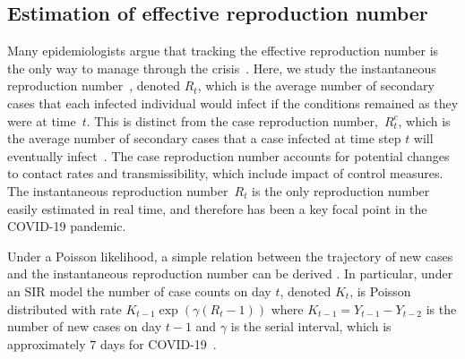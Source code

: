\documentclass[11pt]{amsart}
\numberwithin{equation}{section}
\theoremstyle{plain}
\begin{document}
 \subsection{Estimation of effective reproduction number}
 \label{section:r0-estimation}
 Many epidemiologists argue that tracking the effective reproduction number is the only way to manage through the crisis~\citep{Gabriel2020}.
Here, we study the instantaneous reproduction number~\citep{Cori20113,Fraser2007}, denoted $R_t$, which is the average number of secondary cases that each infected individual would infect if the conditions remained as they were at time~$t$.  This is distinct from the case reproduction number,~$R_t^c$, which is the average number of secondary cases that a case infected at time step $t$ will eventually infect~\citep{Wallinga2004}. The case reproduction number accounts for potential changes to contact rates and transmissibility, which include impact of control measures.  The instantaneous reproduction number~$R_t$ is the only reproduction number easily estimated in real time, and therefore has been a key focal point in the COVID-19 pandemic.

Under a Poisson likelihood, a simple relation between the trajectory of new cases and the instantaneous reproduction number can be derived \citep{Bettencourt2008}.  In particular, under an SIR model the number of case counts on day $t$, denoted $K_t$, is Poisson distributed with rate $K_{t-1} \exp \left( \gamma (R_t - 1) \right)$ where $K_{t-1} = Y_{t-1}-Y_{t-2}$ is the number of new cases on day $t-1$ and $\gamma$ is the serial interval, which is approximately $7$ days for COVID-19~\citep{Sanche2020}.
\end{document}

